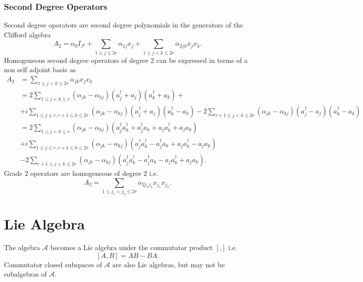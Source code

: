 \documentclass[aps, preprint]{revtex4}
\begin{document}
\subsubsection{Second Degree Operators}
Second degree operators are second degree polynomials in the generators of the Clifford algebra
\begin{equation*}A_{2} =\alpha _{0} I_{\mathcal{F}} +\sum _{1 \leq j \leq 2 r}\alpha _{1 j} x_{j} +\sum _{1 \leq j <k \leq 2 r}\alpha _{2 j k} x_{j} x_{k} .
\end{equation*}Homogeneous second degree operators of degree 2 can be expressed in terms of a non self adjoint basis as
\begin{align}A_{2} &  =\sum _{1 \leq j <k \leq 2 r}\alpha _{j k} x_{j} x_{k} \nonumber  \\
 &  =2 \sum _{1 \leq j <k \leq r}\left (\alpha _{j k} -\alpha _{k j}\right ) \left (a_{j}^{ \dag } +a_{j}\right ) \left (a_{k}^{ \dag } +a_{k}\right ) + \nonumber  \\
 &  +i \sum _{1 \leq j \leq r ,r +1 \leq k \leq 2 r}\left (\alpha _{j k} -\alpha _{k j}\right ) \left (a_{j}^{ \dag } +a_{j}\right ) \left (a_{k}^{ \dag } -a_{k}\right ) -2 \sum _{r +1 \leq j <k \leq 2 r}\left (\alpha _{j k} -\alpha _{k j}\right ) \left (a_{j}^{ \dag } -a_{j}\right ) \left (a_{k}^{ \dag } -a_{k}\right ) \nonumber  \\
 &  =2 \sum _{1 \leq j <k \leq r}\left (\alpha _{j k} -\alpha _{k j}\right ) \left (a_{j}^{ \dag } a_{k}^{ \dag } +a_{j}^{ \dag } a_{k} +a_{j} a_{k}^{ \dag } +a_{j} a_{k}\right ) \nonumber  \\
 &  +i \sum _{1 \leq j \leq r ,r +1 \leq k \leq 2 r}\left (\alpha _{j k} -\alpha _{k j}\right ) \left (a_{j}^{ \dag } a_{k}^{ \dag } -a_{j}^{ \dag } a_{k} +a_{j} a_{k}^{ \dag } -a_{j} a_{k}\right ) \nonumber  \\
 &  -2 \sum _{r +1 \leq j <k \leq 2 r}\left (\alpha _{j k} -\alpha _{k j}\right ) \left (a_{j}^{ \dag } a_{k}^{ \dag } -a_{j}^{ \dag } a_{k} -a_{j} a_{k}^{ \dag } +a_{j} a_{k}\right )\text{.}\end{align}Grade $2$ operators are homogeneous of degree $2$ i.e.
\begin{equation}A_{2} =\sum _{1 \leq j_{1} <j_{2} \leq 2 r}\alpha _{2 j_{1} j_{2}} x_{j_{1}} x_{j_{2}}\text{.}
\end{equation}

\section{Lie Algebra}
The algebra $\mathcal{A}$ becomes a Lie algebra under the commutator product $\left [\text{,}\right ]$ i.e.
\begin{equation}\left [A ,B\right ] =A B -B A\text{.}
\end{equation}Commutator closed subspaces of $\mathcal{A}$ are also Lie algebras, but may not be subalgebras of $\mathcal{A}\text{.}$ 
\end{document}
